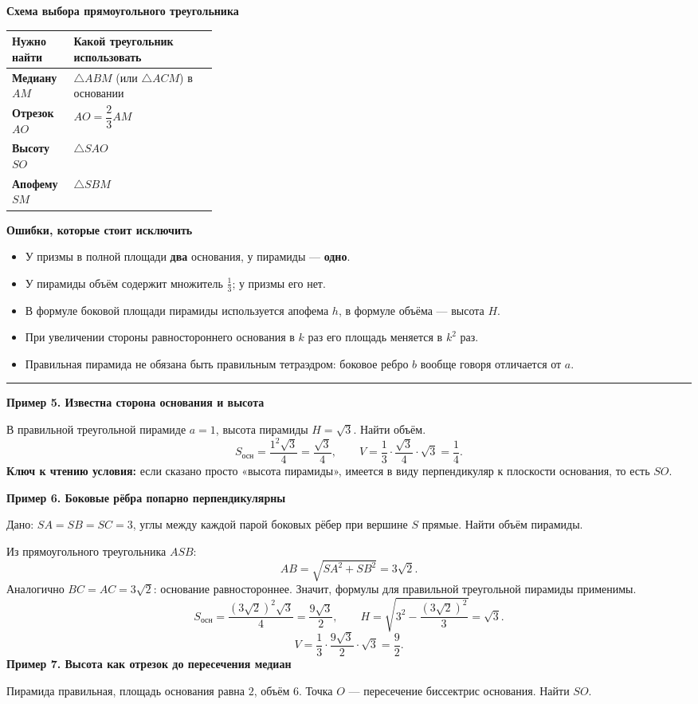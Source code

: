 \documentclass[a4paper,11pt]{article}
\newcommand{\topic}[1]{\vspace{6pt}{\Large\bfseries\color{darkaccent}#1}\par\vspace{4pt}\hrule\vspace{12pt}}
\newcommand{\point}[1]{\textcolor{darkaccent}{\textbf{#1}}}
\newcommand{\smhead}[1]{\medskip\textbf{\color{darkaccent}#1}\par}
\begin{document}
\smhead{Схема выбора прямоугольного треугольника}
\begin{tabularx}{\linewidth}{@{}>{\bfseries}p{0.30\linewidth}X@{}}
\toprule
Нужно найти & Какой треугольник использовать \\
\midrule
Медиану $AM$ & $\triangle ABM$ (или $\triangle ACM$) в основании \\
Отрезок $AO$ & $AO=\dfrac23 AM$ \\
Высоту $SO$ & $\triangle SAO$ \\
Апофему $SM$ & $\triangle SBM$ \\
\bottomrule
\end{tabularx}

\smhead{Ошибки, которые стоит исключить}
\begin{itemize}
\item У призмы в полной площади \textbf{два} основания, у пирамиды --- \textbf{одно}.
\item У пирамиды объём содержит множитель $\frac13$; у призмы его нет.
\item В формуле боковой площади пирамиды используется апофема $h$, в формуле объёма --- высота $H$.
\item При увеличении стороны равностороннего основания в $k$ раз его площадь меняется в $k^2$ раз.
\item Правильная пирамида не обязана быть правильным тетраэдром: боковое ребро $b$ вообще говоря отличается от $a$.
\end{itemize}

\clearpage
\topic{5. Разобранные задачи на пирамиду}
\smhead{Пример 5. Известна сторона основания и высота}
В правильной треугольной пирамиде $a=1$, высота пирамиды $H=\sqrt3$. Найти объём.
\[
S_{\text{осн}}=\frac{1^2\sqrt3}{4}=\frac{\sqrt3}{4},\qquad
V=\frac13\cdot\frac{\sqrt3}{4}\cdot\sqrt3=\boxed{\frac14}.
\]
\point{Ключ к чтению условия:} если сказано просто «высота пирамиды», имеется в виду перпендикуляр к плоскости основания, то есть $SO$.

\smhead{Пример 6. Боковые рёбра попарно перпендикулярны}
Дано: $SA=SB=SC=3$, углы между каждой парой боковых рёбер при вершине $S$ прямые. Найти объём пирамиды.

Из прямоугольного треугольника $ASB$:
\[
AB=\sqrt{SA^2+SB^2}=3\sqrt2.
\]
Аналогично $BC=AC=3\sqrt2$: основание равностороннее. Значит, формулы для правильной треугольной пирамиды применимы.
\[
S_{\text{осн}}=\frac{(3\sqrt2)^2\sqrt3}{4}=\frac{9\sqrt3}{2},
\qquad H=\sqrt{3^2-\frac{(3\sqrt2)^2}{3}}=\sqrt3.
\]
\[
V=\frac13\cdot\frac{9\sqrt3}{2}\cdot\sqrt3=\boxed{\frac92}.
\]
\smhead{Пример 7. Высота как отрезок до пересечения медиан}
Пирамида правильная, площадь основания равна $2$, объём $6$. Точка $O$ --- пересечение биссектрис основания. Найти $SO$.
\end{document}
